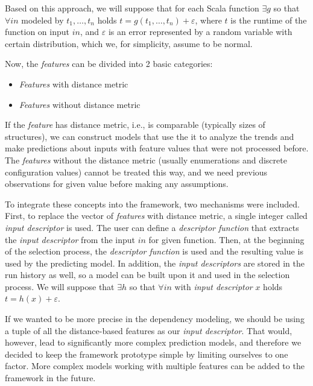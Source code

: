 Based on this approach, we will suppose that for each Scala function \(\exists g\) so that \(\forall in\) modeled by $t_1, \dots, t_n$ holds \(t = g(t_1, \dots, t_n) + \varepsilon\), where \(t\) is the runtime of the function on input \(in\), and $\varepsilon$ is an error represented by a random variable with certain distribution, which we, for simplicity, assume to be normal. 

Now, the \textit{features} can be divided into 2 basic categories:

\begin{itemize}
	\item \textit{Features} with distance metric
	\item \textit{Features} without distance metric
\end{itemize}

If the \textit{feature} has distance metric, i.e., is comparable (typically sizes of structures), we can construct models that use the it to analyze the trends and make predictions about inputs with feature values that were not processed before. The \textit{features} without the distance metric (usually enumerations and discrete configuration values) cannot be treated this way, and we need previous observations for given value before making any assumptions. 

To integrate these concepts into the framework, two mechanisms were included. First, to replace the vector of \textit{features} with distance metric, a single integer called \textit{input descriptor} is used. The user can define a \textit{descriptor function} that extracts the \textit{input descriptor} from the input $in$ for given function. Then, at the beginning of the selection process, the \textit{descriptor function} is used and the resulting value is used by the predicting model. In addition, the \textit{input descriptors} are stored in the run history as well, so a model can be built upon it and used in the selection process. We will suppose that \(\exists h\) so that \(\forall in\) with \textit{input descriptor} $x$ holds \(t = h(x) + \varepsilon\).

If we wanted to be more precise in the dependency modeling, we should be using a tuple of all the distance-based features as our \textit{input descriptor}. That would, however, lead to significantly more complex prediction models, and therefore we decided to keep the framework prototype simple by limiting ourselves to one factor. More complex models working with multiple features can be added to the framework in the future.

